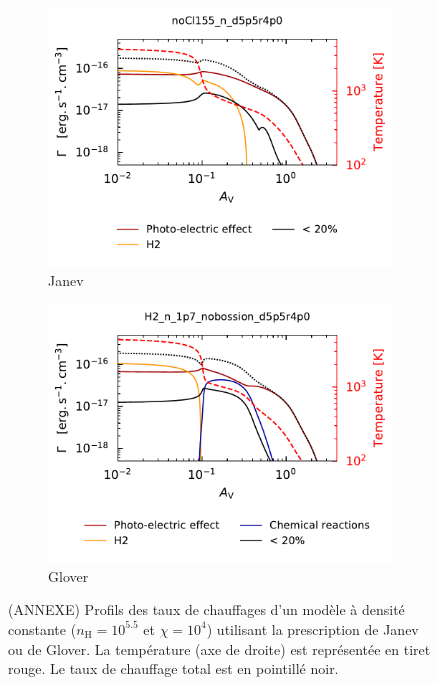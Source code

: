 \begin{figure}[!h]
    \centering
    \begin{subfigure}[t]{0.49\textwidth} %
        \centering \includegraphics[trim = {0 0 0 1cm },clip,width=1\textwidth]{figure/H2/bosse_dcte_janevVSglover/janev/heat.pdf}
        \caption{Janev}
    \end{subfigure}
    \begin{subfigure}[t]{0.49\textwidth}
        \centering \includegraphics[trim = {0 0 0 1cm },clip,width=1\textwidth]{figure/H2/bosse_dcte_janevVSglover/glover/heat.pdf}
        \caption{Glover}
    \end{subfigure}
    \caption{(ANNEXE) Profils des taux de chauffages d'un modèle à densité constante ($n_\mathrm{H} = 10^{5.5}$ et $\chi = 10^4$) utilisant la prescription de Janev ou de Glover. La température (axe de droite) est représentée en tiret rouge. Le taux de chauffage total est en pointillé noir.}
    \label{fig:H2:bosse:heat}
\end{figure}


